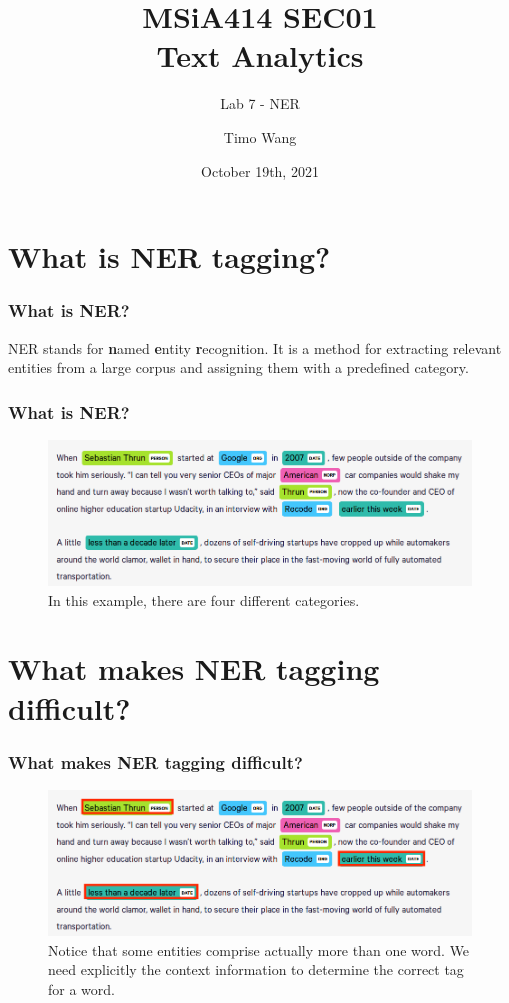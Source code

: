 \documentclass{beamer}
\begin{document}
\title{MSiA414 SEC01\\ Text Analytics}
\subtitle{Lab 7 - NER}
\author{Timo Wang}
\date{October 19th, 2021}

\begin{frame}
    \titlepage
\end{frame}


\section{What is NER tagging?}
\begin{frame}
    \frametitle{What is NER?}
    NER stands for \textbf{n}amed \textbf{e}ntity \textbf{r}ecognition. It is a method for extracting relevant entities from a large corpus and assigning them with a predefined category.
\end{frame}

\begin{frame}
    \frametitle{What is NER?}
    \begin{figure}
        \includegraphics[scale=0.3]{ner_example}
        \caption{In this example, there are four different categories.}
    \end{figure}
\end{frame}


\section{What makes NER tagging difficult?}
\begin{frame}
    \frametitle{What makes NER tagging difficult?}
    \begin{figure}
        \includegraphics[scale=0.3]{ner_example_difficult}
        \caption{Notice that some entities comprise actually more than one word. We need explicitly the context information to determine the correct tag for a word.}
    \end{figure}
\end{frame}
\end{document}
